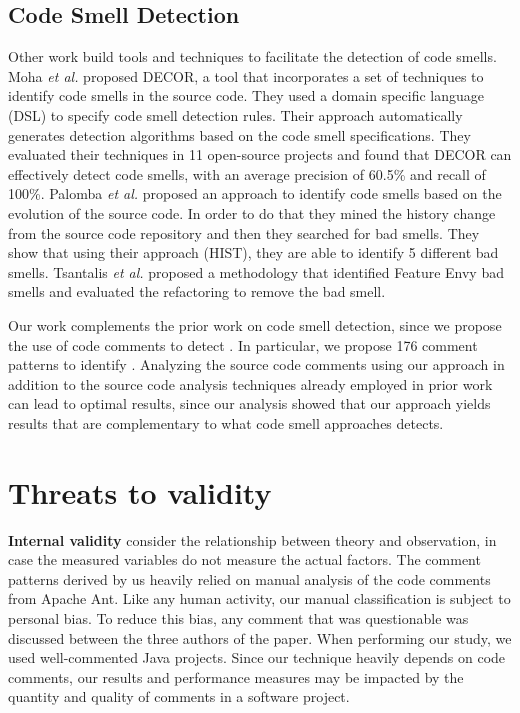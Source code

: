 \subsection{Code Smell Detection}

Other work build tools and techniques to facilitate the detection of code smells. Moha \textit{et al.} \cite{Moha2010TSE} proposed DECOR, a tool that incorporates a set of techniques to identify code smells in the source code. They used a domain specific language (DSL) to specify code smell detection rules. Their approach automatically generates detection algorithms based on the code smell specifications. They evaluated their techniques in 11 open-source projects and found that DECOR can effectively detect code smells, with an average precision of 60.5\% and recall of 100\%. Palomba \textit{et al.} \cite{Palomba2013} proposed an approach to identify code smells based on the evolution of the source code. In order to do that they mined the history change from the source code repository and then they searched for bad smells. They show that using their approach (HIST), they are able to identify 5 different bad smells. Tsantalis \textit{et al.} \cite{Tsantalis2009TSE} proposed a methodology that identified Feature Envy bad smells and evaluated the refactoring to remove the bad smell.

Our work complements the prior work on code smell detection, since we propose the use of code comments to detect \SADTD. In particular, we propose 176 comment patterns to identify \SADTD. Analyzing the source code comments using our approach in addition to the source code analysis techniques already employed in prior work can lead to optimal results, since our analysis showed that our approach yields results that are complementary to what code smell approaches detects.

\section{Threats to validity}
\label{sec:threats_to_validity}


\noindent\textbf{Internal validity} consider the relationship between theory and observation, in case the measured variables do not measure the actual factors. The comment patterns derived by us heavily relied on manual analysis of the code comments from Apache Ant. Like any human activity, our manual classification is subject to personal bias. To reduce this bias, any comment that was questionable was discussed between the three authors of the paper. When performing our study, we used well-commented Java projects. Since our technique heavily depends on code comments, our results and performance measures may be impacted by the quantity and quality of comments in a software project.  

